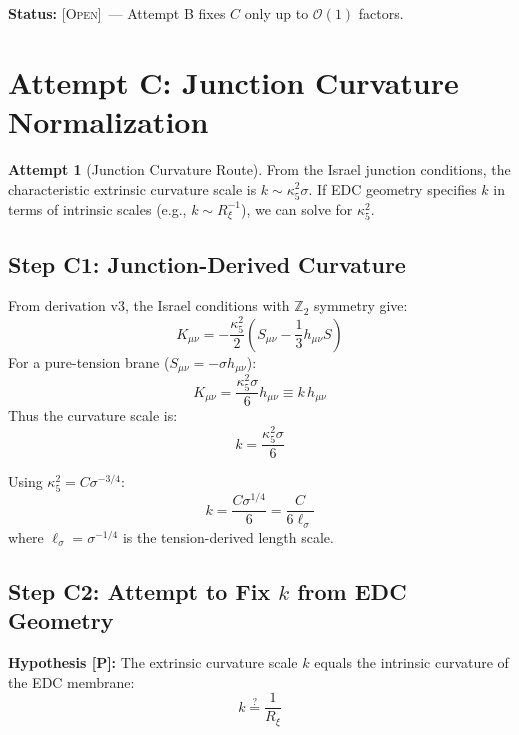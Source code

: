 \documentclass[11pt,a4paper]{article}
\theoremstyle{definition}
\newtheorem{attempt}{Attempt}
\newcommand{\Post}{\textsc{[P]}}
\newcommand{\Open}{\textsc{[Open]}}
\begin{document}
\textbf{Status:} \Open\ --- Attempt B fixes $C$ only up to $\mathcal{O}(1)$ factors.

\section{Attempt C: Junction Curvature Normalization}
\label{sec:attempt_c}

\begin{attempt}[Junction Curvature Route]
From the Israel junction conditions, the characteristic extrinsic curvature scale is
$k \sim \kappa_5^2 \sigma$. If EDC geometry specifies $k$ in terms of intrinsic scales
(e.g., $k \sim R_\xi^{-1}$), we can solve for $\kappa_5^2$.
\end{attempt}

\subsection{Step C1: Junction-Derived Curvature}

From derivation v3, the Israel conditions with $\mathbb{Z}_2$ symmetry give:
\begin{equation}
K_{\mu\nu} = -\frac{\kappa_5^2}{2}\left(S_{\mu\nu} - \frac{1}{3}h_{\mu\nu}S\right)
\end{equation}
For a pure-tension brane ($S_{\mu\nu} = -\sigma h_{\mu\nu}$):
\begin{equation}
K_{\mu\nu} = \frac{\kappa_5^2 \sigma}{6} h_{\mu\nu} \equiv k \, h_{\mu\nu}
\end{equation}
Thus the curvature scale is:
\begin{equation}
k = \frac{\kappa_5^2 \sigma}{6}
\label{eq:k_junction}
\end{equation}

Using $\kappa_5^2 = C \sigma^{-3/4}$:
\begin{equation}
k = \frac{C \sigma^{1/4}}{6} = \frac{C}{6 \ell_\sigma}
\label{eq:k_ell_sigma}
\end{equation}
where $\ell_\sigma = \sigma^{-1/4}$ is the tension-derived length scale.

\subsection{Step C2: Attempt to Fix $k$ from EDC Geometry}

\textbf{Hypothesis \Post:} The extrinsic curvature scale $k$ equals the intrinsic
curvature of the EDC membrane:
\begin{equation}
k \stackrel{?}{=} \frac{1}{R_\xi}
\label{eq:k_Rxi}
\end{equation}
\end{document}
